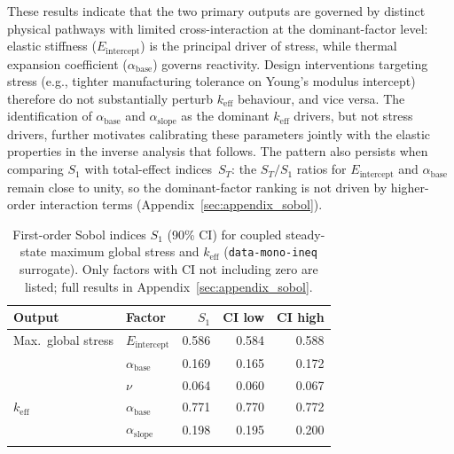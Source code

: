\documentclass[pdflatex,sn-mathphys-num]{sn-jnl}
\theoremstyle{thmstyleone}
\theoremstyle{thmstyletwo}
\theoremstyle{thmstylethree}
\begin{document}
These results indicate that the two primary outputs are governed by distinct physical
pathways with limited cross-interaction at the dominant-factor level: elastic stiffness
($E_{\mathrm{intercept}}$) is the principal driver of stress, while thermal expansion
coefficient ($\alpha_{\mathrm{base}}$) governs reactivity.
Design interventions targeting stress (e.g., tighter manufacturing tolerance on Young's
modulus intercept) therefore do not substantially perturb $k_{\mathrm{eff}}$ behaviour,
and vice versa.
The identification of $\alpha_{\mathrm{base}}$ and $\alpha_{\mathrm{slope}}$ as
the dominant $k_{\mathrm{eff}}$ drivers, but not stress drivers, further motivates
calibrating these parameters jointly with the elastic properties in the inverse
analysis that follows.
The pattern also persists when comparing $S_1$ with total-effect indices~$S_T$:
the $S_T/S_1$ ratios for $E_{\mathrm{intercept}}$ and $\alpha_{\mathrm{base}}$
remain close to unity, so the dominant-factor ranking is not driven by
higher-order interaction terms (Appendix~\ref{sec:appendix_sobol}).

\begin{table}[ht]
\caption{%
  First-order Sobol indices $S_1$ (90\% CI) for coupled steady-state
  maximum global stress and $k_{\mathrm{eff}}$
  (\texttt{data-mono-ineq} surrogate).
  Only factors with CI not including zero are listed; full results in
  Appendix~\ref{sec:appendix_sobol}.
}\label{tab:sobol}
\begin{tabular}{@{}llrrr@{}}
\toprule
Output & Factor & $S_1$ & CI low & CI high \\
\midrule
Max.\ global stress & $E_{\mathrm{intercept}}$   & 0.586 & 0.584 & 0.588 \\
                    & $\alpha_{\mathrm{base}}$   & 0.169 & 0.165 & 0.172 \\
                    & $\nu$                      & 0.064 & 0.060 & 0.067 \\
\midrule
$k_{\mathrm{eff}}$  & $\alpha_{\mathrm{base}}$   & 0.771 & 0.770 & 0.772 \\
                    & $\alpha_{\mathrm{slope}}$  & 0.198 & 0.195 & 0.200 \\
\botrule
\end{tabular}
\end{table}
\end{document}
